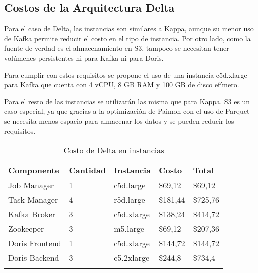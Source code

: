 \newpage


\subsection{Costos de la Arquitectura Delta}

Para el caso de Delta, las instancias son similares a Kappa, aunque su menor uso de Kafka permite reducir el costo en el tipo de instancia.
Por otro lado, como la fuente de verdad es el almacenamiento en S3, tampoco se necesitan tener volúmenes persistentes ni para Kafka ni para Doris.\newline

Para cumplir con estos requisitos se propone el uso de una instancia c5d.xlarge para Kafka que cuenta con 4 vCPU, 8 GB RAM y 100 GB de disco efímero.\newline

Para el resto de las instancias se utilizarán las misma que para Kappa. 
S3 es un caso especial, ya que gracias a la optimización de Paimon con el uso de Parquet se necesita menos espacio para almacenar los datos y 
se pueden reducir los requisitos.

\newpage

\begin{longtable}{|p{3cm}|p{2cm}|p{2cm}|p{2cm}|p{3cm}|}
    \hline
    \textbf{Componente} & \textbf{Cantidad} & \textbf{Instancia} & \textbf{Costo} & \textbf{Total} \\
    \hline
    Job Manager & 1 & c5d.large & \$69,12 & \$69,12 \\
    \hline
    Task Manager & 4 & r5d.large & \$181,44 & \$725,76 \\
    \hline
    Kafka Broker & 3 & c5d.xlarge & \$138,24 & \$414,72 \\
    \hline
    Zookeeper & 3 & m5.large & \$69,12 & \$207,36 \\
    \hline
    Doris Frontend & 1 & c5d.xlarge & \$144,72 & \$144,72 \\
    \hline
    Doris Backend & 3 & c5.2xlarge & \$244,8 & \$734,4 \\
    \hline
    \caption{Costo de Delta en instancias} \\
\end{longtable}

